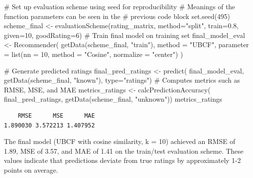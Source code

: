 \documentclass[
  12pt]{article}
\newenvironment{Shaded}{\begin{snugshade}}{\end{snugshade}}
\newcommand{\AttributeTok}[1]{\textcolor[rgb]{0.40,0.45,0.13}{#1}}
\newcommand{\CommentTok}[1]{\textcolor[rgb]{0.37,0.37,0.37}{#1}}
\newcommand{\DecValTok}[1]{\textcolor[rgb]{0.68,0.00,0.00}{#1}}
\newcommand{\FloatTok}[1]{\textcolor[rgb]{0.68,0.00,0.00}{#1}}
\newcommand{\FunctionTok}[1]{\textcolor[rgb]{0.28,0.35,0.67}{#1}}
\newcommand{\NormalTok}[1]{\textcolor[rgb]{0.00,0.23,0.31}{#1}}
\newcommand{\OtherTok}[1]{\textcolor[rgb]{0.00,0.23,0.31}{#1}}
\newcommand{\StringTok}[1]{\textcolor[rgb]{0.13,0.47,0.30}{#1}}
\begin{document}
\begin{Shaded}
\begin{Highlighting}[]
\CommentTok{\# Set up evaluation scheme using seed for reproducibility}
\CommentTok{\# Meanings of the function parameters can be seen in the }
\CommentTok{\# previous code block}
\FunctionTok{set.seed}\NormalTok{(}\DecValTok{495}\NormalTok{)}
\NormalTok{scheme\_final }\OtherTok{\textless{}{-}} \FunctionTok{evaluationScheme}\NormalTok{(rating\_matrix, }
                                 \AttributeTok{method=}\StringTok{"split"}\NormalTok{, }
                                 \AttributeTok{train=}\FloatTok{0.8}\NormalTok{, }
                                 \AttributeTok{given=}\DecValTok{10}\NormalTok{, }
                                 \AttributeTok{goodRating=}\DecValTok{6}\NormalTok{)}
\CommentTok{\# Train final model on training set}
\NormalTok{final\_model\_eval }\OtherTok{\textless{}{-}} \FunctionTok{Recommender}\NormalTok{(}
  \FunctionTok{getData}\NormalTok{(scheme\_final, }\StringTok{"train"}\NormalTok{),}
  \AttributeTok{method    =} \StringTok{"UBCF"}\NormalTok{,}
  \AttributeTok{parameter =} \FunctionTok{list}\NormalTok{(}\AttributeTok{nn =} \DecValTok{10}\NormalTok{, }
                   \AttributeTok{method =} \StringTok{"Cosine"}\NormalTok{, }
                   \AttributeTok{normalize =} \StringTok{"center"}\NormalTok{)}
\NormalTok{)}

\CommentTok{\# Generate predicted ratings }
\NormalTok{final\_pred\_ratings }\OtherTok{\textless{}{-}} \FunctionTok{predict}\NormalTok{(}
\NormalTok{  final\_model\_eval, }
  \FunctionTok{getData}\NormalTok{(scheme\_final, }\StringTok{"known"}\NormalTok{), }
  \AttributeTok{type=}\StringTok{"ratings"}\NormalTok{)}
\CommentTok{\# Computes metrics such as RMSE, MSE, and MAE}
\NormalTok{metrics\_ratings }\OtherTok{\textless{}{-}} \FunctionTok{calcPredictionAccuracy}\NormalTok{(}
\NormalTok{  final\_pred\_ratings, }
  \FunctionTok{getData}\NormalTok{(scheme\_final, }\StringTok{"unknown"}\NormalTok{))}
\NormalTok{metrics\_ratings}
\end{Highlighting}
\end{Shaded}

\begin{verbatim}
    RMSE      MSE      MAE 
1.890030 3.572213 1.407952 
\end{verbatim}

The final model (UBCF with cosine similarity, k = 10) achieved an RMSE
of 1.89, MSE of 3.57, and MAE of 1.41 on the train/test evaluation
scheme. These values indicate that predictions deviate from true ratings
by approximately 1-2 points on average.
\end{document}
